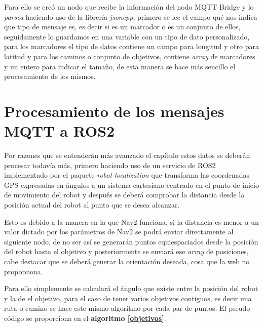 Para ello se creó un nodo que recibe la información del nodo MQTT Bridge y 
lo \textit{parsea} haciendo uso de la librería \textit{jsoncpp}, primero se lee el campo qué nos indica que tipo de mensaje es, es 
decir si es un marcador o es un conjunto de ellos, seguidamente lo guardamos en una variable con un tipo de dato personalizado, para los 
marcadores el tipo de datos contiene un campo para longitud y otro para latitud y para los caminos o conjunto de objetivos, contiene \textit{array} de marcadores y un entero 
para indicar el tamaño, de esta manera se hace más sencillo el procesamiento de los mismos.


\newpage
\section{Procesamiento de los mensajes MQTT a ROS2}
Por razones que se entenderán más avanzado el capítulo estos datos se deberán procesar todavía más, primero haciendo uso de un servicio de ROS2 
implementado por el paquete \textit{robot localization} que transforma las coordenadas GPS expresadas en ángulos a un sistema cartesiano 
centrado en el punto de inicio de movimiento del robot y después se deberá comprobar la distancia desde la posición actual del robot al punto que se desea alcanzar.

Esto es debido a la manera en la que Nav2 funciona, si la distancia es menor a un valor dictado por los parámetros de Nav2 se podrá enviar directamente 
al siguiente nodo, de no ser así se generarán puntos equiespaciados desde la posición del robot hasta el objetivo y posteriormente se enviará ese \textit{array} 
de posiciones, cabe destacar que se deberá generar la orientación deseada, cosa que la web no proporciona.

Para ello simplemente se calculará el ángulo que existe entre la posición del robot y la de el objetivo, para el caso de tener varios objetivos contiguos, es decir una 
ruta o camino se hace este mismo algoritmo por cada par de puntos. El pseudo código se proporciona en el \textbf{algoritmo \ref{objetivos}}.

